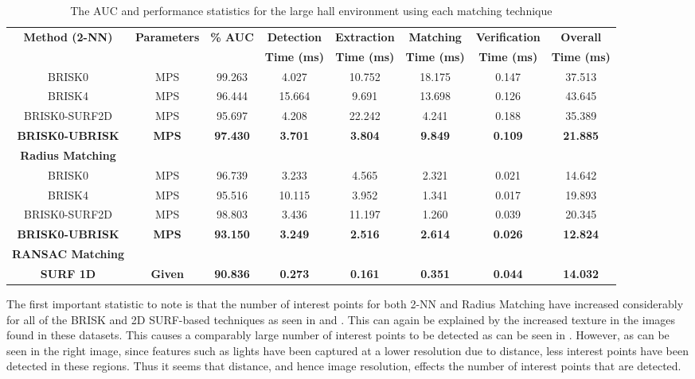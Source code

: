 \documentclass[11pt]{report}
\begin{document}
\begin{table}
\centering
\caption{The AUC and performance statistics for the large hall environment
using each matching technique}

\footnotesize
\begin{tabular}{|c|c|c|c|c|c|c|c|}
\hline 
\textbf{Method (2-NN)} & \textbf{Parameters} & \textbf{\% AUC} & \textbf{Detection} & \textbf{Extraction} & \textbf{Matching} & \textbf{Verification} & \textbf{Overall}\tabularnewline
 &  &  & \textbf{Time (ms)} & \textbf{Time (ms)} & \textbf{Time (ms)} & \textbf{Time (ms)} & \textbf{Time (ms)}\tabularnewline
\hline 
\hline 
BRISK0 & MPS & 99.263 & 4.027 & 10.752 & 18.175 & 0.147 & 37.513\tabularnewline
\hline 
BRISK4 & MPS & 96.444 & 15.664 & 9.691 & 13.698 & 0.126 & 43.645\tabularnewline
\hline 
BRISK0-SURF2D & MPS & 95.697 & 4.208 & 22.242 & 4.241 & 0.188 & 35.389\tabularnewline
\hline 
\textbf{BRISK0-UBRISK} & \textbf{MPS} & \textbf{97.430} & \textbf{3.701} & \textbf{3.804} & \textbf{9.849} & \textbf{0.109} & \textbf{21.885}\tabularnewline
\hline 
\hline 
\textbf{Radius Matching} &  &  &  &  &  &  & \tabularnewline
\hline 
BRISK0 & MPS & 96.739 & 3.233 & 4.565 & 2.321 & 0.021 & 14.642\tabularnewline
\hline 
BRISK4 & MPS & 95.516 & 10.115 & 3.952 & 1.341 & 0.017 & 19.893\tabularnewline
\hline 
BRISK0-SURF2D & MPS & 98.803 & 3.436 & 11.197 & 1.260 & 0.039 & 20.345\tabularnewline
\hline 
\textbf{BRISK0-UBRISK} & \textbf{MPS} & \textbf{93.150} & \textbf{3.249} & \textbf{2.516} & \textbf{2.614} & \textbf{0.026} & \textbf{12.824}\tabularnewline
\hline 
\hline 
\textbf{RANSAC Matching} &  &  &  &  &  &  & \tabularnewline
\hline 
\textbf{SURF 1D} & \textbf{Given} & \textbf{90.836} & \textbf{0.273} & \textbf{0.161} & \textbf{0.351} & \textbf{0.044} & \textbf{14.032}\tabularnewline
\hline 
\end{tabular}
\label{tab:lh_times}
\end{table}

The first important statistic to note is that the number of interest points for both 2-NN and Radius Matching have increased considerably for all of the BRISK and 2D SURF-based techniques as seen in  and . This can again be explained by the increased texture in the images found in these datasets. This causes a comparably large number of interest points to be detected as can be seen in . However, as can be seen in the right image, since features such as lights have been captured at a lower resolution due to distance, less interest points have been detected in these regions. Thus it seems that distance, and hence image resolution, effects the number of interest points that are detected.\\
\end{document}
